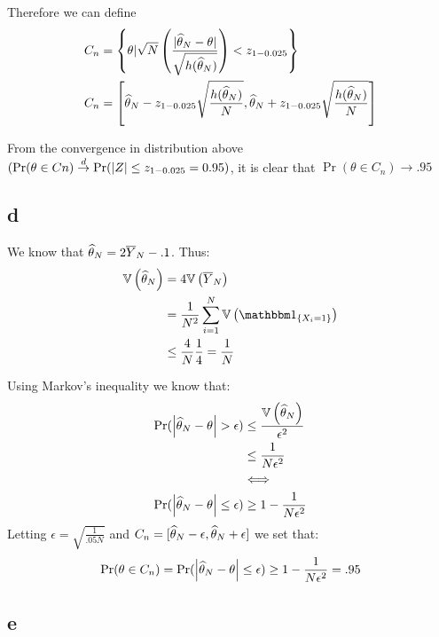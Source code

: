 \documentclass[12pt]{paper}
\begin{document}
Therefore we can define
\begin{equation*}
\begin{split}
C_n&=\left\{\theta| \sqrt{N} \left(  \frac{|\widehat{ \theta }_{N} - \theta|}{\sqrt{h(\widehat{ \theta }_{N})}} \right)<z_{1-0.025}\right\}\\
C_n &= \left[ \widehat{ \theta }_{N} - z_{1-0.025}\sqrt{ \frac{h(\widehat{ \theta }_{N})}{N}}, \widehat{ \theta }_{N} + z_{1-0.025}
\sqrt{ \frac{h( \widehat{ \theta }_{N})}{N}} \right]
\end{split}
\end{equation*}

From the convergence in distribution above $(\Pr(\theta\in Cn)\overset{d}{\to} \Pr(|Z|\le z_{1-0.025}=0.95)$, it is clear that $\Pr( \theta \in
C_n) \rightarrow .95$

\subsection*{d}

We know that $\widehat{ \theta }_{N} = 2 \overline{ Y }_{N} - .1$. Thus:
\begin{align*}
  \Vari{\est{\theta}} &= 4 \Vari{\mean{Y}}\\
                 &= \frac{1}{N^2} \sum_{i=1}^N \Vari{ \indicate{ X_i = 1}}\\
                 &\leq \frac{4}{N} \frac{1}{4} = \frac{1}{N}\\  
\end{align*}


Using Markov's inequality we know that:
\begin{align*}
  \Pr( \left \lvert  \widehat{ \theta }_{N} - \theta \right \rvert > \epsilon) &\leq \frac{\mathbb{V} \left ( \widehat{ \theta }_{N} \right )}{\epsilon^2}\\
                               &\le \frac{1}{N \epsilon^2}\\
                               &\Longleftrightarrow\\
\Pr( \left \lvert  \widehat{ \theta }_{N} - \theta \right \rvert \le \epsilon) &\ge 1- \frac{1}{N \epsilon^2}\\
\end{align*}
Letting $\epsilon = \sqrt{\frac{1}{.05 N}}$ and $C_n = [\widehat{ \theta }_{N} - \epsilon, \widehat{ \theta }_{N} +
\epsilon]$ we set that:
\begin{equation*}
  \Pr( \theta \in C_n) = \Pr( \left \lvert  \widehat{ \theta }_{N} - \theta \right \rvert \le \epsilon) \ge 1- \frac{1}{N \epsilon^2} = .95
\end{equation*}

\subsection*{e}
\end{document}
